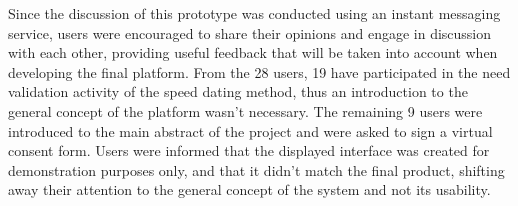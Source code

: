 {{Since the discussion of this prototype was conducted using an instant messaging service, users were encouraged to share their opinions and engage in discussion with each other, providing useful feedback that will be taken into account when developing the final platform. From the 28 users, 19 have participated in the need validation activity of the speed dating method, thus an introduction to the general concept of the platform wasn't necessary. The remaining 9 users were introduced to the main abstract of the project and were asked to sign a virtual consent form. Users were informed that the displayed interface was created for demonstration purposes only, and that it didn't match the final product, shifting away their attention to the general concept of the system and not its usability.


\begin{figure}[htbp]
	\centering
	 \qquad
	 \qquad

\end{figure}}}
